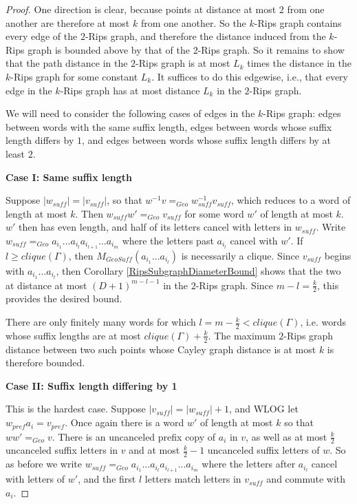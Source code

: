 \documentclass{amsart}
\theoremstyle{definition}
\theoremstyle{remark}
\begin{document}
	\begin{proof}
		
		One direction is clear, because points at distance at most $2$ from one another are therefore at most $k$ from one another. So the $k$-Rips graph contains every edge of the $2$-Rips graph, and therefore the distance induced from the $k$-Rips graph is bounded above by that of the $2$-Rips graph. So it remains to show that the path distance in the $2$-Rips graph is at most $L_k$ times the distance in the $k$-Rips graph for some constant $L_k$. It suffices to do this edgewise, i.e., that every edge in the $k$-Rips graph has at most distance $L_k$ in the $2$-Rips graph.
		
		We will need to consider the following cases of edges in the $k$-Rips graph: edges between words with the same suffix length, edges between words whose suffix length differs by $1$, and edges between words whose suffix length differs by at least $2$.
		
		\textbf{Case I: Same suffix length}
		
		Suppose $|w_{suff}|=|v_{suff}|$, so that $w^{-1}v=_{Geo}w_{suff}^{-1}v_{suff}$, which reduces to a word of length at most $k$. Then $w_{suff}w'=_{Geo}v_{suff}$ for some word $w'$ of length at most $k$. $w'$ then has even length, and half of its letters cancel with letters in $w_{suff}$. Write \newline $w_{suff}=_{Geo}a_{i_1}...a_{i_l}a_{i_{l+1}}...a_{i_m}$ where the letters past $a_{i_l}$ cancel with $w'$. If $l\ge clique(\Gamma)$, then $M_{GeoSuff}(a_{i_1}...a_{i_l})$ is necessarily a clique. Since $v_{suff}$ begins with $a_{i_1}...a_{i_l}$, then Corollary \ref{RipsSubgraphDiameterBound} shows that the two at distance at most $(D+1)^{m-l-1}$ in the $2$-Rips graph. Since $m-l=\frac{k}{2}$, this provides the desired bound.
		
		There are only finitely many words for which $l=m-\frac{k}{2}<clique(\Gamma)$, i.e. words whose suffix lengths are at most $clique(\Gamma)+\frac{k}{2}$. The maximum $2$-Rips graph distance between two such points whose Cayley graph distance is at most $k$ is therefore bounded.
		
		\textbf{Case II: Suffix length differing by 1}
		
		This is the hardest case. Suppose $|v_{suff}|=|w_{suff}|+1$, and WLOG let $w_{pref}a_i=v_{pref}$. Once again there is a word $w'$ of length at most $k$ so that $ww'=_{Geo}v$. There is an uncanceled prefix copy of $a_i$ in $v$, as well as at most $\frac{k}{2}$ uncanceled suffix letters in $v$ and at most $\frac{k}{2}-1$ uncanceled suffix letters of $w$. So as before we write $w_{suff}=_{Geo}a_{i_1}...a_{i_l}a_{i_{l+1}}...a_{i_m}$ where the letters after $a_{i_l}$ cancel with letters of $w'$, and the first $l$ letters match letters in $v_{suff}$ and commute with $a_i$. 
		

\end{proof}
\end{document}
